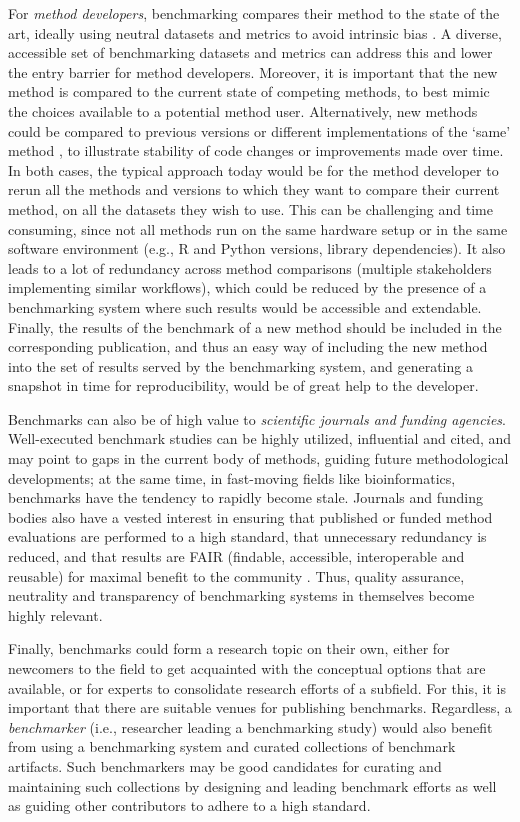 \documentclass[11pt]{article}
\begin{document}
For \emph{method developers}, benchmarking compares their method to the state of the art, ideally using neutral datasets and metrics to avoid intrinsic bias \cite{Boulesteix2013-vy, Weber2019-el}. A diverse, accessible set of benchmarking datasets and metrics can address this and lower the entry barrier for method developers. Moreover, it is important that the new method is compared to the current state of competing methods, to best mimic the choices available to a potential method user. Alternatively, new methods could be compared to previous versions or different implementations of the `same' method \cite{Rich2024-jh}, to illustrate stability of code changes or improvements made over time. In both cases, the typical approach today would be for the method developer to rerun all the methods and versions to which they want to compare their current method, on all the datasets they wish to use. This can be challenging and time consuming, since not all methods run on the same hardware setup or in the same software environment (e.g., R and Python versions, library dependencies). It also leads to a lot of redundancy across method comparisons (multiple stakeholders implementing similar workflows), which could be reduced by the presence of a benchmarking system where such results would be accessible and extendable. Finally, the results of the benchmark of a new method should be included in the corresponding publication, and thus an easy way of including the new method into the set of results served by the benchmarking system, and generating a snapshot in time for reproducibility, would be of great help to the developer. 

Benchmarks can also be of high value to \emph{scientific journals and funding agencies}. Well-executed benchmark studies can be highly utilized, influential and cited, and may point to gaps in the current body of methods, guiding future methodological developments; at the same time, in fast-moving fields like bioinformatics, benchmarks have the tendency to rapidly become stale. Journals and funding bodies also have a vested interest in ensuring that published or funded method evaluations are performed to a high standard, that unnecessary redundancy is reduced, and that results are FAIR (findable, accessible, interoperable and reusable) for maximal benefit to the community \cite{Wilkinson2016-bh}. Thus, quality assurance, neutrality and transparency of benchmarking systems in themselves become highly relevant. 

Finally, benchmarks could form a research topic on their own, either for newcomers to the field to get acquainted with the conceptual options that are available, or for experts to consolidate research efforts of a subfield. For this, it is important that there are suitable venues for publishing benchmarks. Regardless, a \emph{benchmarker} (i.e., researcher leading a benchmarking study) would also benefit from using a benchmarking system and curated collections of benchmark artifacts. Such benchmarkers may be good candidates for curating and maintaining such collections by designing and leading benchmark efforts as well as guiding other contributors to adhere to a high standard. 
\end{document}
